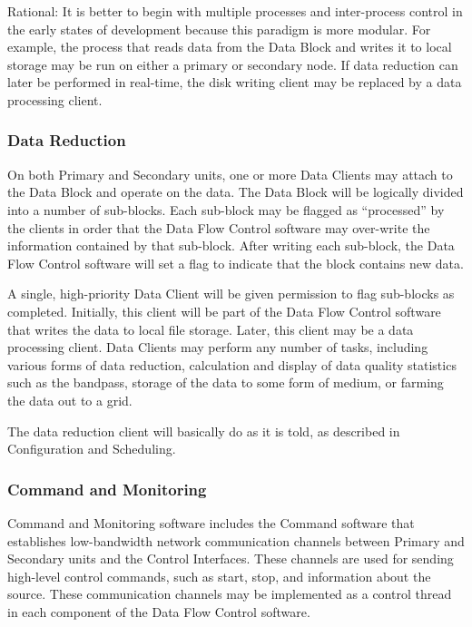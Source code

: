 Rational: It is better to begin with multiple processes and
inter-process control in the early states of development because this
paradigm is more modular.  For example, the process that reads data
from the Data Block and writes it to local storage may be run on
either a primary or secondary node.  If data reduction can later be
performed in real-time, the disk writing client may be replaced by a
data processing client.

\subsubsection{Data Reduction}

On both Primary and Secondary units, one or more Data Clients may
attach to the Data Block and operate on the data.  The Data Block will
be logically divided into a number of sub-blocks.  Each sub-block may
be flagged as ``processed'' by the clients in order that the Data Flow
Control software may over-write the information contained by that
sub-block.  After writing each sub-block, the Data Flow Control
software will set a flag to indicate that the block contains new data.

A single, high-priority Data Client will be given permission to flag
sub-blocks as completed.  Initially, this client will be part of the
Data Flow Control software that writes the data to local file storage.
Later, this client may be a data processing client.  Data Clients may
perform any number of tasks, including various forms of data
reduction, calculation and display of data quality statistics such as
the bandpass, storage of the data to some form of medium, or farming
the data out to a grid.

The data reduction client will basically do as it is told, as
described in Configuration and Scheduling.

\subsubsection{Command and Monitoring}

Command and Monitoring software includes the Command software that
establishes low-bandwidth network communication channels between
Primary and Secondary units and the Control Interfaces.  These
channels are used for sending high-level control commands, such as
start, stop, and information about the source.  These communication
channels may be implemented as a control thread in each component of
the Data Flow Control software. 

